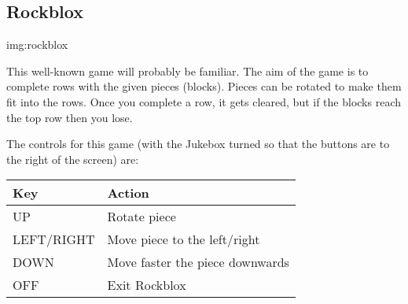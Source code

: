 \subsection{Rockblox}
%
{img:rockblox}

This well{}-known game will probably be familiar. The aim of the game is
to complete rows with the given pieces (blocks). Pieces can be rotated
to make them fit into the rows.  Once you complete a row, it gets
cleared, but if the blocks reach the top row then you lose.

The controls for this game (with the Jukebox turned so that the buttons
are to the right of the screen) are:

\begin{table}[h!]
\begin{center}
\begin{tabular}{@{}ll@{}}\toprule
\textbf{Key} & \textbf{Action} \\\midrule
UP & Rotate piece \\
LEFT/RIGHT & Move piece to the left/right \\
DOWN & Move faster the piece downwards \\
OFF & Exit Rockblox\\\bottomrule
\end{tabular}
\end{center}
\end{table}
